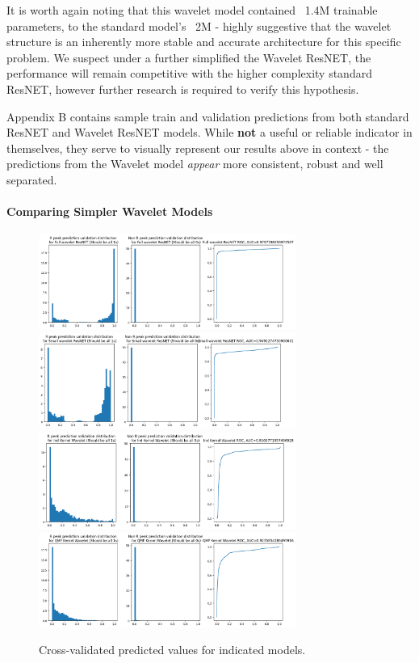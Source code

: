 \documentclass[9pt,conference]{IEEEtran}
\begin{document}
It is worth again noting that this wavelet model contained ~1.4M trainable parameters, to the standard model's ~2M - highly suggestive that the wavelet structure is an inherently more stable and accurate architecture for this specific problem. We suspect under a further simplified the Wavelet ResNET, the performance will remain competitive with the higher complexity standard ResNET, however further research is required to verify this hypothesis.

Appendix B contains sample train and validation predictions from both standard ResNET and Wavelet ResNET models. While \textbf{not} a useful or reliable indicator in themselves, they serve to visually represent our results above in context - the predictions from the Wavelet model \textit{appear} more consistent, robust and well separated.

\paragraph{\textbf{Comparing Simpler Wavelet Models}}

\begin{figure}[H]
    \centering
    \includegraphics[width=0.75\textwidth]{waveletNetDist.png}
    \includegraphics[width=0.75\textwidth]{smallWaveletNetDist.png}
    \includegraphics[width=0.75\textwidth]{indWaveletDist.png}
    \includegraphics[width=0.75\textwidth]{qmfWaveletDist.png}
    \caption{Cross-validated predicted values for indicated models.}
\end{figure}
\end{document}
